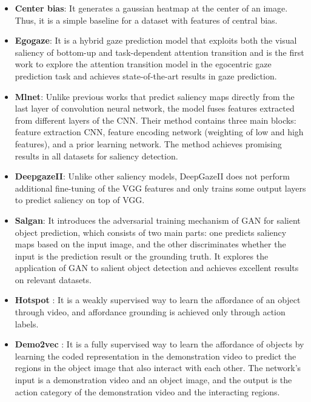 \documentclass[journal,twoside]{IEEEtran}
\begin{document}
\begin{itemize}

\item [] 
\textbf{Center bias}: It generates a gaussian heatmap at the center of an image. Thus, it is a simple baseline for a dataset with features of central bias. 

\item [] 
\textbf{Egogaze}\cite{DBLP:conf/eccv/HuangCLS18}: It is a hybrid gaze prediction model that exploits both the visual saliency of bottom-up and task-dependent attention transition and is the first work to explore the attention transition model in the egocentric gaze prediction task and achieves state-of-the-art results in gaze prediction.

\item [] 
\textbf{Mlnet}\cite{DBLP:conf/icpr/CorniaBSC16}: Unlike previous works that predict saliency maps directly from the last layer of convolution neural network, the model fuses features extracted from different layers of the CNN. Their method contains three main blocks: feature extraction CNN, feature encoding network (weighting of low and high features), and a prior learning network. The method achieves promising results in all datasets for saliency detection.

\item []
\textbf{DeepgazeII}\cite{DBLP:journals/corr/KummererWB16}: Unlike other saliency models, DeepGazeII does not perform additional fine-tuning of the VGG features and only trains some output layers to predict saliency on top of VGG.

\item []
\textbf{Salgan}\cite{Pan_2017_SalGAN}: It introduces the adversarial training mechanism of GAN for salient object prediction, which consists of two main parts: one predicts saliency maps based on the input image, and the other discriminates whether the input is the prediction result or the grounding truth. It explores the application of GAN to salient object detection and achieves excellent results on relevant datasets. 

\item []
\textbf{Hotspot} \cite{interaction-hotspots}: It is a weakly supervised way to learn the affordance of an object through video, and affordance grounding is achieved only through action labels. 

\item []
\textbf{Demo2vec} \cite{demo2vec2018cvpr}: It is a fully supervised way to learn the affordance of objects by learning the coded representation in the demonstration video to predict the regions in the object image that also interact with each other. The network's input is a demonstration video and an object image, and the output is the action category of the demonstration video and the interacting regions.


\end{itemize}
\end{document}
